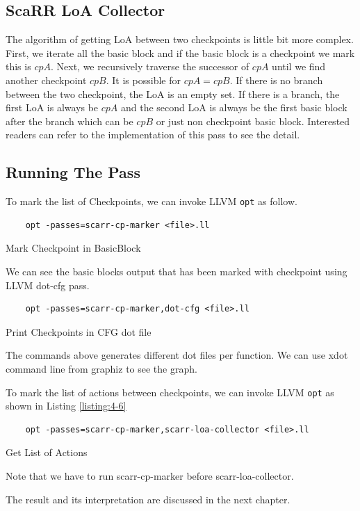 \subsection{ScaRR LoA Collector}

The algorithm of getting LoA between two checkpoints is little bit more complex. First, we iterate all the basic block and if the basic block is a checkpoint we mark this is $cpA$. Next, we recursively traverse the successor of $cpA$ until we find another checkpoint $cpB$. It is possible for $cpA = cpB$. If there is no branch between the two checkpoint, the LoA is an empty set. If there is a branch, the first LoA is always be $cpA$ and the second LoA is always be the first basic block after the branch \textemdash{} which can be $cpB$ or just non checkpoint basic block. Interested readers can refer to the implementation of this pass to see the detail.

\subsection{Running The Pass}

To mark the list of Checkpoints, we can invoke LLVM \texttt{opt} as follow.

\begin{listing}
\begin{verbatim}
    opt -passes=scarr-cp-marker <file>.ll
\end{verbatim}
\caption{Mark Checkpoint in BasicBlock}    
\label{listing:4-4}
\end{listing}

We can see the basic blocks output that has been marked with checkpoint using LLVM dot-cfg pass.

\begin{listing}
\begin{verbatim}
    opt -passes=scarr-cp-marker,dot-cfg <file>.ll
\end{verbatim}
\caption{Print Checkpoints in CFG dot file}    
\label{listing:4-5}
\end{listing}

The commands above generates different dot files per function. We can use xdot command line from graphiz to see the graph. 

To mark the list of actions between checkpoints, we can invoke LLVM \texttt{opt} as shown in Listing \ref{listing:4-6}

\begin{listing}
\begin{verbatim}
    opt -passes=scarr-cp-marker,scarr-loa-collector <file>.ll
\end{verbatim}
\caption{Get List of Actions}    
\label{listing:4-6}
\end{listing}

Note that we have to run scarr-cp-marker before scarr-loa-collector.

The result and its interpretation are discussed in the next chapter.